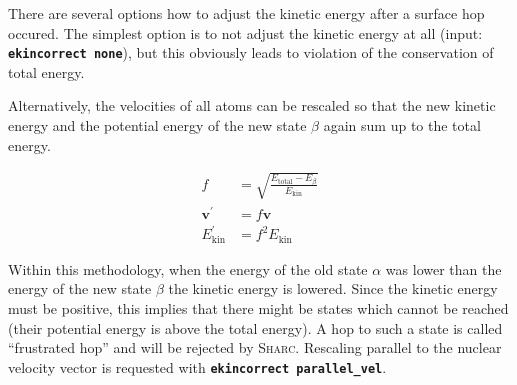 \documentclass[a4paper,11pt,DIV=15,openany,twoside=false]{scrbook}
\newcommand{\ttmdump}[1]{#1}
\newcommand{\sharc}{\textsc{Sharc}}
\newcommand{\ttt}[1]{\textbf{\texttt{#1}}}
\newcommand{\VEC}[1]{\ensuremath{\mathbf{#1}}}
\begin{document}
There are several options how to adjust the kinetic energy after a surface hop occured. The simplest option is to not adjust the kinetic energy at all (input: \ttt{ekincorrect none}), but this obviously leads to violation of the conservation of total energy.

Alternatively, the velocities of all atoms can be rescaled so that the new kinetic energy and the potential energy of the new state $\beta$ again sum up to the total energy.
\ttmdump{
  \begin{align}
    f&=\sqrt{\frac{E_{\text{total}}-E_\beta}{E_{\text{kin}}}}\\
    \VEC{v}^\prime&=f\VEC{v}\\
    E_{\text{kin}}^\prime&=f^2E_{\text{kin}}
  \end{align}
}
Within this methodology, when the energy of the old state $\alpha$ was lower than the energy of the new state $\beta$ the kinetic energy is lowered. Since the kinetic energy must be positive, this implies that there might be states which cannot be reached (their potential energy is above the total energy). A hop to such a state is called ``frustrated hop'' and will be rejected by \sharc. Rescaling parallel to the nuclear velocity vector is requested with \ttt{ekincorrect parallel\_vel}.
\end{document}
